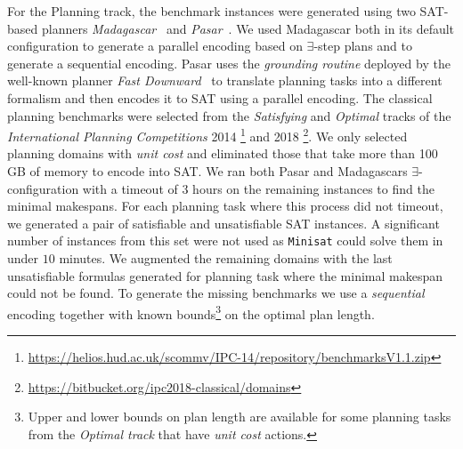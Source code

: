 \documentclass{elsarticle}
\newcommand{\solver}[1]{\texttt{#1}}
\begin{document}
For the Planning track,
the benchmark instances were generated using two SAT-based planners
\emph{Madagascar}~\cite{Madagascar14} and \emph{Pasar}~\cite{Pasar19}. We used
Madagascar both in its default configuration to generate a parallel encoding
based on $\exists$-step plans and to generate a sequential encoding. Pasar uses
the \emph{grounding routine} deployed by the well-known planner \emph{Fast
  Downward}~\cite{FastDownward06} to translate planning tasks into a different
formalism and then encodes it to SAT using a parallel encoding.
The classical planning benchmarks were selected from the \emph{Satisfying} and
\emph{Optimal} tracks of the \emph{International Planning Competitions} 2014
\footnote{\url{https://helios.hud.ac.uk/scommv/IPC-14/repository/benchmarksV1.1.zip}}
and 2018 \footnote{\url{https://bitbucket.org/ipc2018-classical/domains}}. We
only selected planning domains with \emph{unit cost} and eliminated those that
take more than 100 GB of memory to encode into SAT. We ran both Pasar and
Madagascars $\exists$-configuration with a timeout of 3 hours on the
remaining instances to find the minimal makespans. For each planning task where
this process did not timeout, we generated a pair of satisfiable and
unsatisfiable SAT instances. A significant number of instances from this set were not used
as \solver{Minisat} could solve them in under $10$ minutes.
We augmented the remaining domains with the last unsatisfiable formulas
generated for planning task where the minimal makespan could not be found.
To generate the missing benchmarks we use a \emph{sequential} encoding
together with known bounds\footnote{Upper and lower bounds on plan length are available for
	some planning tasks from the \emph{Optimal track} that have \emph{unit cost}
	actions.} on the optimal plan length.
\end{document}
